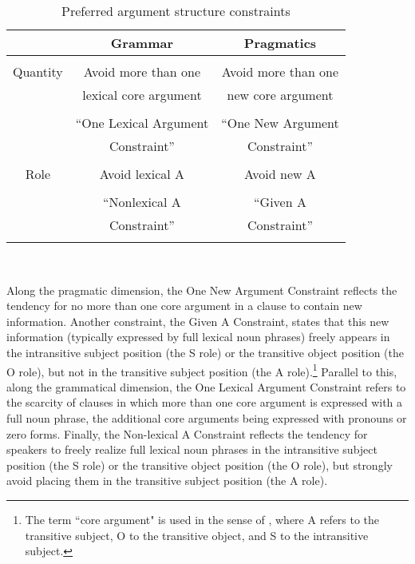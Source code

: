 \begin{table}[htp]
\begin{center}
\caption{\small{Preferred argument structure constraints \citep[34]{dubois2003a}}}
\begin{tabular}{| c || c | c |}\hline
 & Grammar & Pragmatics  \\
\hline
\hline
 & & \\
Quantity & Avoid more than one  & Avoid more than one  \\
 & lexical core argument  &  new core argument   \\
  & & \\
   & ``One Lexical Argument & ``One New Argument \\
 &  Constraint'' &  Constraint'' \\
    \hline
 & & \\
 Role & Avoid lexical A & Avoid new A  \\
  & & \\
 & ``Nonlexical A & ``Given A \\
 & Constraint'' & Constraint'' \\
 & & \\
 \hline
\end{tabular}\\
\label{constraints}
\end{center}
\end{table}

Along the pragmatic dimension, the One New Argument Constraint reflects the tendency for no more than one core argument in a clause to contain new information. Another constraint, the Given A Constraint, states that this new information (typically expressed by full lexical noun phrases) freely appears in the intransitive subject position (the S role) or the transitive object position (the O role), but not in the transitive subject position (the A role).\footnote{The term ``core argument" is used in the sense of \citet{dixon1979}, where A refers to the transitive subject, O to the transitive object, and S to the intransitive subject.} Parallel to this, along the grammatical dimension, the One Lexical Argument Constraint refers to the scarcity of clauses in which more than one core argument is expressed with a full noun phrase, the additional core arguments being expressed with pronouns or zero forms. Finally, the Non-lexical A Constraint reflects the tendency for speakers to freely realize full lexical noun phrases in the intransitive subject position (the S role) or the transitive object position (the O role), but strongly avoid placing them in the transitive subject position (the A role). 

